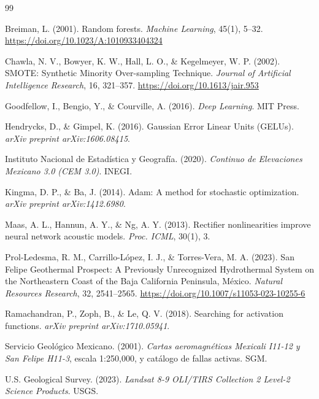 \documentclass[10pt,twocolumn,letterpaper]{article}
\begin{document}
\begin{thebibliography}{99}
\setlength{\itemsep}{0pt}
\setlength{\parskip}{0pt}
\scriptsize

Breiman, L. (2001). Random forests. \emph{Machine Learning}, 45(1), 5--32. \url{https://doi.org/10.1023/A:1010933404324}

Chawla, N. V., Bowyer, K. W., Hall, L. O., \& Kegelmeyer, W. P. (2002). SMOTE: Synthetic Minority Over-sampling Technique. \emph{Journal of Artificial Intelligence Research}, 16, 321--357. \url{https://doi.org/10.1613/jair.953}

Goodfellow, I., Bengio, Y., \& Courville, A. (2016). \emph{Deep Learning}. MIT Press.

Hendrycks, D., \& Gimpel, K. (2016). Gaussian Error Linear Units (GELUs). \emph{arXiv preprint arXiv:1606.08415}.

Instituto Nacional de Estadística y Geografía. (2020). \emph{Continuo de Elevaciones Mexicano 3.0 (CEM 3.0)}. INEGI.

Kingma, D. P., \& Ba, J. (2014). Adam: A method for stochastic optimization. \emph{arXiv preprint arXiv:1412.6980}.

Maas, A. L., Hannun, A. Y., \& Ng, A. Y. (2013). Rectifier nonlinearities improve neural network acoustic models. \emph{Proc. ICML}, 30(1), 3.

Prol-Ledesma, R. M., Carrillo-López, I. J., \& Torres-Vera, M. A. (2023). San Felipe Geothermal Prospect: A Previously Unrecognized Hydrothermal System on the Northeastern Coast of the Baja California Peninsula, México. \emph{Natural Resources Research}, 32, 2541--2565. \url{https://doi.org/10.1007/s11053-023-10255-6}

Ramachandran, P., Zoph, B., \& Le, Q. V. (2018). Searching for activation functions. \emph{arXiv preprint arXiv:1710.05941}.

Servicio Geológico Mexicano. (2001). \emph{Cartas aeromagnéticas Mexicali I11-12 y San Felipe H11-3}, escala 1:250{,}000, y catálogo de fallas activas. SGM.

U.S. Geological Survey. (2023). \emph{Landsat 8-9 OLI/TIRS Collection 2 Level-2 Science Products}. USGS.

\end{thebibliography}
\end{document}
